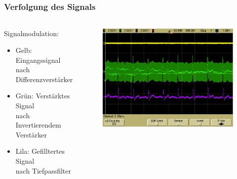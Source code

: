 \begin{frame}
\frametitle{Verfolgung des Signals}
\framesubtitle{}
\begin{columns}[c]
\begin{block}{Signalmodulation:}
     \begin{itemize}
         \item Gelb: Eingangssignal\\
         nach Differenzverstärker
         \item Grün: Verstärktes Signal\\
         nach Invertierendem Verstärker
         \item Lila: Gefilltertes Signal\\
         nach Tiefpassfilter
     \end{itemize}
\end{block}
\begin{figure}[H]
\begin{center}
        \includegraphics[scale=0.15]{./img/oszi/scope_22.png}
\end{center}
\end{figure}
\end{columns}
\end{frame}
